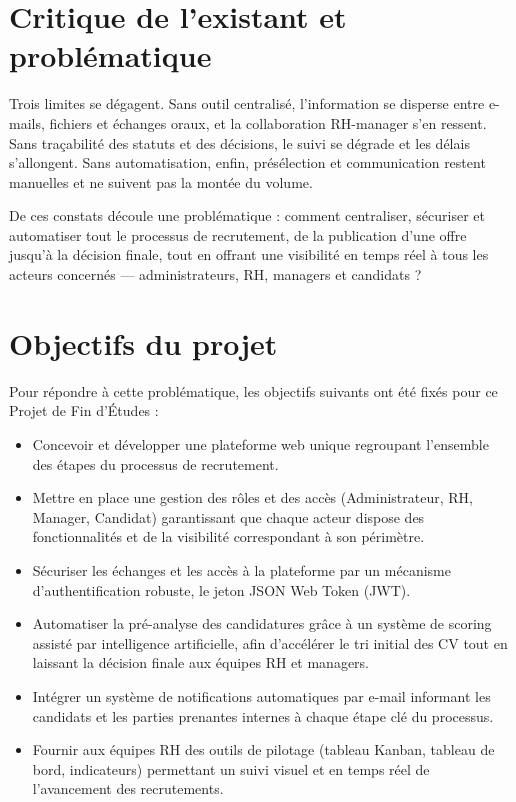 \documentclass[]{./tpl/isipfe}
\begin{document}
\section{Critique de l’existant et problématique}
\label{sec_1_4}
Trois limites se dégagent. Sans outil centralisé, l’information se disperse entre e-mails, fichiers et échanges oraux, et la collaboration RH-manager s’en ressent. Sans traçabilité des statuts et des décisions, le suivi se dégrade et les délais s’allongent. Sans automatisation, enfin, présélection et communication restent manuelles et ne suivent pas la montée du volume.

De ces constats découle une problématique : comment centraliser, sécuriser et automatiser tout le processus de recrutement, de la publication d’une offre jusqu’à la décision finale, tout en offrant une visibilité en temps réel à tous les acteurs concernés — administrateurs, RH, managers et candidats ?

\section{Objectifs du projet}
\label{sec_1_5}
Pour répondre à cette problématique, les objectifs suivants ont été fixés pour ce Projet de Fin d’Études :

\begin{itemize}
\item Concevoir et développer une plateforme web unique regroupant l’ensemble des étapes du processus de recrutement.
\item Mettre en place une gestion des rôles et des accès (Administrateur, RH, Manager, Candidat) garantissant que chaque acteur dispose des fonctionnalités et de la visibilité correspondant à son périmètre.
\item Sécuriser les échanges et les accès à la plateforme par un mécanisme d’authentification robuste, le jeton JSON Web Token (JWT).
\item Automatiser la pré-analyse des candidatures grâce à un système de scoring assisté par intelligence artificielle, afin d’accélérer le tri initial des CV tout en laissant la décision finale aux équipes RH et managers.
\item Intégrer un système de notifications automatiques par e-mail informant les candidats et les parties prenantes internes à chaque étape clé du processus.
\item Fournir aux équipes RH des outils de pilotage (tableau Kanban, tableau de bord, indicateurs) permettant un suivi visuel et en temps réel de l’avancement des recrutements.
\end{itemize}
\end{document}
